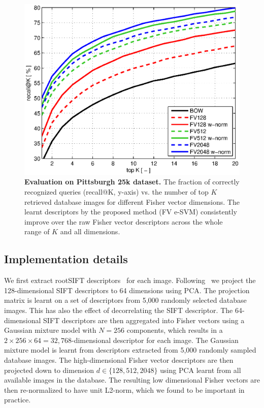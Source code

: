 \documentclass[10pt,twocolumn,letterpaper]{article}
\begin{document}
      \begin{figure}[t!]
         \centering
         \includegraphics[width=\linewidth]{imgs/plotPitt25kSURF}    
         \caption{
            \textbf{Evaluation on Pittsburgh 25k \cite{Gronat13} dataset.} The fraction of correctly recognized queries (recall@K, y-axis) vs. the number of top $K$ retrieved database images for different Fisher vector dimensions. The learnt descriptors by the proposed method (FV e-SVM) consistently improve over the raw Fisher vector descriptors across the whole range of $K$  and all dimensions.
         }
         \label{fig:recall}
      \end{figure}

   \subsection{Implementation details}
      We first extract rootSIFT descriptors~\cite{Arandjelovic12} for each image. Following~\cite{Jegou12} we project the 128-dimensional SIFT descriptors to 64 dimensions using PCA. The projection matrix is learnt on a set of descriptors from 5,000 randomly selected database images. This has also the effect of decorrelating the SIFT descriptor. 
      The 64-dimensional SIFT descriptors are then aggregated into Fisher vectors using a Gaussian mixture model with $N=256$ components, which  results in a $2\times256\times64 = 32,768$-dimensional descriptor for each image. The Gaussian mixture model is learnt from descriptors extracted from 5,000 randomly sampled database images. 
      The  high-dimensional Fisher vector descriptors are then projected down to dimension $d\in\{128,512, 2048\}$ using PCA learnt from all available images in the database. 
      The resulting low dimensional Fisher vectors are then re-normalized to have unit L2-norm, which we found to be important in practice. 
\end{document}
